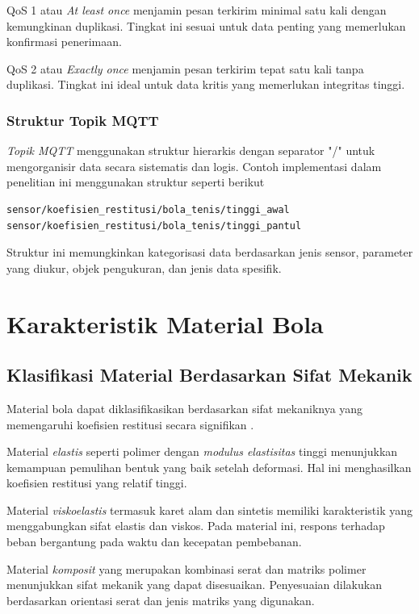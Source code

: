 QoS 1 atau \textit{At least once} menjamin pesan terkirim minimal satu kali dengan kemungkinan duplikasi. Tingkat ini sesuai untuk data penting yang memerlukan konfirmasi penerimaan. 

QoS 2 atau \textit{Exactly once} menjamin pesan terkirim tepat satu kali tanpa duplikasi. Tingkat ini ideal untuk data kritis yang memerlukan integritas tinggi.

\subsubsection{Struktur Topik MQTT}
\textit{Topik MQTT} menggunakan struktur hierarkis dengan separator "/" 
untuk mengorganisir data secara sistematis dan logis. Contoh implementasi 
dalam penelitian ini menggunakan struktur seperti berikut
\begin{verbatim}
sensor/koefisien_restitusi/bola_tenis/tinggi_awal
sensor/koefisien_restitusi/bola_tenis/tinggi_pantul
\end{verbatim}
Struktur ini memungkinkan kategorisasi data berdasarkan jenis sensor, parameter yang 
diukur, objek pengukuran, dan jenis data spesifik.



\section{Karakteristik Material Bola}

\subsection{Klasifikasi Material Berdasarkan Sifat Mekanik}
Material bola dapat diklasifikasikan berdasarkan sifat mekaniknya yang memengaruhi koefisien restitusi secara signifikan \citep{kalnins2018separation}. 

Material \textit{elastis} seperti polimer dengan \textit{modulus elastisitas} tinggi menunjukkan kemampuan pemulihan bentuk yang baik setelah deformasi. Hal ini menghasilkan koefisien restitusi yang relatif tinggi. 

Material \textit{viskoelastis} termasuk karet alam dan sintetis memiliki karakteristik yang menggabungkan sifat elastis dan viskos. Pada material ini, respons terhadap beban bergantung pada waktu dan kecepatan pembebanan. 

Material \textit{komposit} yang merupakan kombinasi serat dan matriks polimer menunjukkan sifat mekanik yang dapat disesuaikan. Penyesuaian dilakukan berdasarkan orientasi serat dan jenis matriks yang digunakan.

